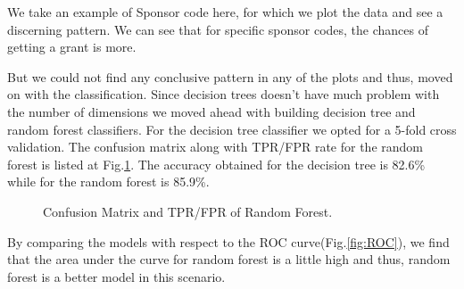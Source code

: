 \documentclass{article} %
\begin{document}
We take an example of Sponsor code here, for which we plot the data and see a discerning pattern. We can see that for specific sponsor codes, the chances of getting a grant is more.

But we could not find any conclusive pattern in any of the plots and thus, moved on with the classification. Since decision trees doesn't have much problem with the number of dimensions we moved ahead with building decision tree and random forest classifiers. For the decision tree classifier we opted for a 5-fold cross validation. The confusion matrix along with TPR/FPR rate for the random forest is listed at Fig.\ref{fig:RFCM}. The accuracy obtained for the decision tree is 82.6\% while for the random forest is 85.9\%.

\begin{figure}[h]
	\begin{center}
	\end{center}
	\caption{Confusion Matrix and TPR/FPR of Random Forest.}
	\label{fig:RFCM}
\end{figure}

By comparing the models with respect to the ROC curve(Fig.\ref{fig:ROC}), we find that the area under the curve for random forest is a little high and thus, random forest is a better model in this scenario.
\end{document}
